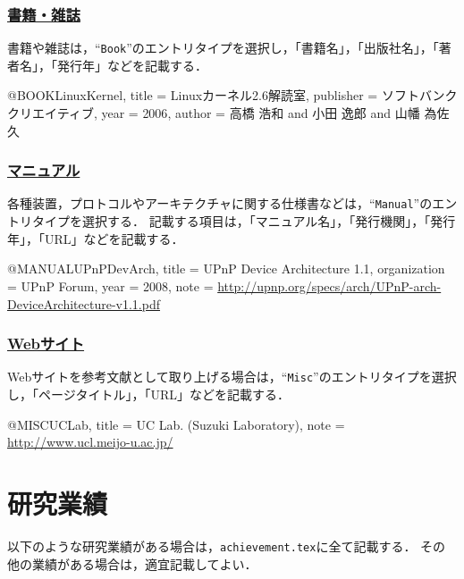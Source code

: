 \documentclass[a4j,11pt]{ujreport}
\begin{document}
\vspace{-1zh}
\subsubsection{\underline{書籍・雑誌}}
書籍や雑誌は，``\texttt{Book}''のエントリタイプを選択し，「書籍名」，「出版社名」，「著者名」，「発行年」などを記載する．

\begin{code}
@BOOK{LinuxKernel,
  title = {Linuxカーネル2.6解読室},
  publisher = {ソフトバンククリエイティブ},
  year = {2006},
  author = {高橋 浩和 and 小田 逸郎 and 山幡 為佐久}
}
\end{code}

\vspace{-1zh}
\subsubsection{\underline{マニュアル}}
各種装置，プロトコルやアーキテクチャに関する仕様書などは，``\texttt{Manual}''のエントリタイプを選択する．
記載する項目は，「マニュアル名」，「発行機関」，「発行年」，「URL」などを記載する．

\begin{code}
@MANUAL{UPnPDevArch,
  title = {UPnP Device Architecture 1.1},
  organization = {UPnP Forum},
  year = {2008},
  note = {\url{http://upnp.org/specs/arch/UPnP-arch-DeviceArchitecture-v1.1.pdf}}
}
\end{code}

\vspace{-1zh}
\subsubsection{\underline{Webサイト}}
Webサイトを参考文献として取り上げる場合は，``\texttt{Misc}''のエントリタイプを選択し，「ページタイトル」，「URL」などを記載する．

\begin{code}
@MISC{UCLab,
  title = {UC Lab. (Suzuki Laboratory)},
  note = {\url{http://www.ucl.meijo-u.ac.jp/}}
}
\end{code}


\section{研究業績}
\label{sec:achievement}

以下のような研究業績がある場合は，\texttt{achievement.tex}に全て記載する．
その他の業績がある場合は，適宜記載してよい．
\end{document}
